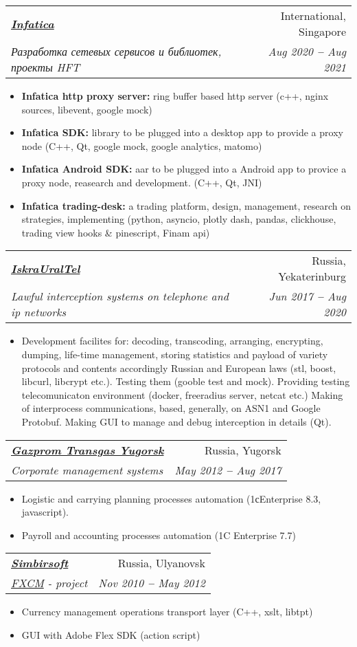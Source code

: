 \documentclass[letterpaper,11pt]{article}
\makeatletter
\newcommand{\resumeItem}[1]{
  \item\small{
    {#1 \vspace{-2pt}}
  }
}
\newcommand{\resumeSubheading}[4]{
  \vspace{-2pt}\item
    \begin{tabular*}{0.97\textwidth}[t]{l@{\extracolsep{\fill}}r}
      \textbf{#1} & #2 \\
      \textit{\small#3} & \textit{\small #4} \\
    \end{tabular*}\vspace{-7pt}
}
\newcommand{\resumeItemListStart}{\begin{itemize}}
\newcommand{\resumeItemListEnd}{\end{itemize}\vspace{-5pt}}
\makeatother
\begin{document}
    \resumeSubheading
      {\emph{\href{http://https://infatica.io/}{\color{blue}Infatica}}}{International, Singapore}
      {Разработка сетевых сервисов и библиотек, проекты HFT }{Aug 2020 \textbf{--} Aug 2021}
        \resumeItemListStart
            \resumeItem{ \textbf{Infatica http proxy server: } ring buffer based http server (c++, nginx sources, libevent, google mock) }
            \resumeItem{ \textbf{Infatica SDK: } library to be plugged into a desktop app to provide a proxy node (C++, Qt, google mock, google analytics, matomo) }
            \resumeItem{ \textbf{Infatica Android SDK: } aar to be plugged into a Android app to provice a proxy node, reasearch and development. (C++, Qt, JNI)}
            \resumeItem{ \textbf{Infatica trading-desk: } a trading platform, design, management, research on strategies, implementing (python, asyncio, plotly dash, pandas, clickhouse, trading view hooks \& pinescript, Finam api)}
        \resumeItemListEnd

    \resumeSubheading
      {\emph{\href{https://iskrauraltel.ru/ru/}{\color{blue}IskraUralTel}}}{Russia, Yekaterinburg}
      {Lawful interception systems on telephone and ip networks}{Jun 2017 \textbf{--} Aug 2020}
        \resumeItemListStart
            \resumeItem{ Development facilites for: decoding, transcoding, arranging, encrypting, dumping, life-time management, storing statistics and payload of variety protocols and contents accordingly Russian and European laws (stl, boost, libcurl, libcrypt etc.). Testing them (gooble test and mock). Providing testing telecomunicaton environment (docker, freeradius server, netcat etc.) Making of interprocess communications, based, generally, on ASN1 and Google Protobuf. Making GUI to manage and debug interception in details (Qt).}
        \resumeItemListEnd

    \resumeSubheading
      {\emph{\href{https://yugorsk-tr.gazprom.ru/}{\color{blue}Gazprom Transgas Yugorsk}}}{Russia, Yugorsk}
      {Corporate management systems}{May 2012 \textbf{--} Aug 2017}
        \resumeItemListStart
            \resumeItem{ Logistic and carrying planning processes automation (1сEnterprise 8.3, javascript). }
            \resumeItem{ Payroll and accounting processes automation (1C Enterprise 7.7) }
        \resumeItemListEnd


    \resumeSubheading
      {\emph{\href{https://simbirsoft.com}{\color{blue}Simbirsoft}}}{Russia, Ulyanovsk}
      {\emph{\href{https://www.fxcm.com/markets/}{\color{blue}FXCM}} - project}{Nov 2010 \textbf{--} May 2012}
        \resumeItemListStart
        \resumeItem{ Currency management operations transport layer (C++, xslt, libtpt) }
        \resumeItem{ GUI with Adobe Flex SDK (action script) }
        \resumeItemListEnd
\end{document}
